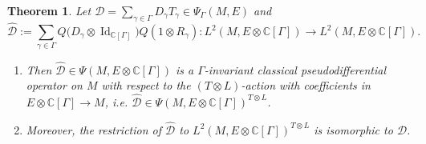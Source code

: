 \documentclass[11pt,a4paper]{amsart}
\newcommand{\C}{\mathbb C}
\newcommand{\maD}{\mathcal D}
\newcommand\<{\langle}
\renewcommand\>{\rangle}
\newcommand{\oid}{\operatorname{Id}}
\newtheorem{theorem}{Theorem}[section]
\theoremstyle{definition}
\begin{document}
\begin{theorem} 
\label{thm.unif}
Let $\maD=\sum_{\gamma\in\Gamma} D_\gamma T_\gamma \in \Psi_\Gamma(M,E)$ and %
\begin{equation}
\hat{\maD}:=\sum_{\gamma\in\Gamma} Q\big(D_\gamma \otimes \oid_{\C[\Gamma]}\big) Q (1 \otimes R_\gamma): L^2(M,E \otimes \C[\Gamma])\longrightarrow L^2(M,E \otimes \C[\Gamma]) .
\end{equation} 
\begin{enumerate}\renewcommand{\labelenumi}{\rm (\alph{enumi})}
\item Then $\hat{\maD}  \in \Psi(M,E \otimes \C[\Gamma])$ %
is a 
$\Gamma$-invariant classical pseudodifferential operator on $M$ with respect to the $(T\otimes L)$-action with 
coefficients in $E\otimes \C[\Gamma] \rightarrow M$, i.e. $\hat{\maD} \in \Psi(M,E \otimes \C[\Gamma])^{T\otimes L}$.
\item Moreover, the restriction of $\hat{\maD}$ to $L^2(M,E\otimes \C[\Gamma])^{T\otimes L}$ is isomorphic to $\maD$.
\end{enumerate}
\end{theorem}
\end{document}
